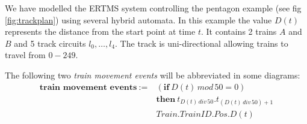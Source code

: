 We have modelled the ERTMS system controlling the pentagon example (see fig \ref{fig:trackplan}) using several hybrid automata. In this example the value $D(t)$ represents the distance from the start point at time $t$. 
It contains 2 trains $A$ and $B$ and 5 track circuits $l_0, \ldots , l_4$. The track is uni-directional allowing trains to travel from $0 - 249$. 
\medskip
\begin{myremark}
The following two \emph{train movement events} will be abbreviated in some diagrams:
\begin{align*}
\textbf{train movement events}  \ :=  \ &( \textbf{if} \ D(t) \, mod \, 50 = 0)  \\
  &\textbf{then} \  t_{D(t) \, div \, 50}.t_{(D(t) \, div \, 50) +1} \\
&Train.TrainID.Pos.D(t)
\end{align*} 

\end{myremark}
